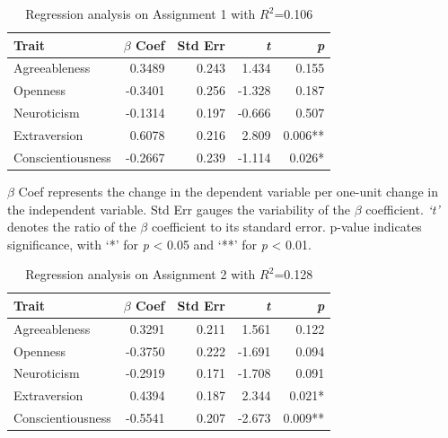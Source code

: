 \begin{table}[h]
  \centering
  \caption{Regression analysis on Assignment 1 with $R^2$=0.106\\\label{tab:assign1Regression}}
    \vspace{-16pt}
  \begin{tabular}{p{2.5cm}rrrr}
    \toprule
    Trait & $\beta$ Coef & Std Err & \textit{t} & \textit{p}\\\midrule
    Agreeableness & 0.3489 & 0.243 & 1.434 & 0.155 \\
    Openness & -0.3401 & 0.256 & -1.328 & 0.187 \\
    Neuroticism & -0.1314 & 0.197 & -0.666 & 0.507 \\
    Extraversion & 0.6078 & 0.216 & 2.809 & 0.006** \\
    Conscientiousness & -0.2667 & 0.239 & -1.114 & 0.026* \\\bottomrule
  \end{tabular}\vspace{-4pt}
\end{table}

$\beta$ Coef represents the change in the dependent variable per one-unit change in the independent variable. Std Err gauges the variability of the $\beta$ coefficient. \textit{`t'} denotes the ratio of the $\beta$ coefficient to its standard error. p-value indicates significance, with `*' for \emph{p} < 0.05 and `**' for \emph{p} < 0.01.

\begin{table}[h]
  \centering
  \caption{Regression analysis on Assignment 2 with $R^2$=0.128\\\label{tab:assign2Regression}}
    \vspace{-16pt}
  \begin{tabular}{p{2.5cm}rrrr}
    \toprule
    Trait & $\beta$ Coef & Std Err & \textit{t} & \textit{p}\\\midrule
    Agreeableness & 0.3291 & 0.211 & 1.561 & 0.122 \\
    Openness & -0.3750 & 0.222 & -1.691 & 0.094\\
    Neuroticism & -0.2919 & 0.171 & -1.708 &  0.091\\
    Extraversion & 0.4394 & 0.187 & 2.344 & 0.021*\\
    Conscientiousness & -0.5541 & 0.207 & -2.673 & 0.009**\\\bottomrule
  \end{tabular}\vspace{-4pt}
\end{table}

